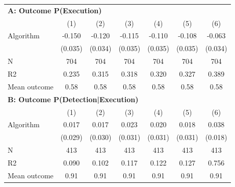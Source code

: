 \begin{tabular}{lcccccc} \toprule
\multicolumn{7}{l}{\textbf{A: Outcome P(Execution)}} \\ \multicolumn{1}{l}{} & (1) & (2) & (3) & (4) & (5) & (6) \\ \midrule
Algorithm   &      -0.150\sym{***}&      -0.120\sym{***}&      -0.115\sym{***}&      -0.110\sym{***}&      -0.108\sym{***}&      -0.063\sym{*}  \\
            &     (0.035)         &     (0.034)         &     (0.035)         &     (0.035)         &     (0.035)         &     (0.034)         \\
\midrule
N           &         704         &         704         &         704         &         704         &         704         &         704         \\
R2          &       0.235         &       0.315         &       0.318         &       0.320         &       0.327         &       0.389         \\
Mean outcome&        0.58         &        0.58         &        0.58         &        0.58         &        0.58         &        0.58         \\

\midrule \multicolumn{7}{l}{\textbf{B: Outcome P(Detection|Execution)}} \\ \multicolumn{1}{l}{} & (1) & (2) & (3) & (4) & (5) & (6) \\ \midrule
Algorithm   &       0.017         &       0.017         &       0.023         &       0.020         &       0.018         &       0.038\sym{**} \\
            &     (0.029)         &     (0.030)         &     (0.031)         &     (0.031)         &     (0.031)         &     (0.018)         \\
\midrule
N           &         413         &         413         &         413         &         413         &         413         &         413         \\
R2          &       0.090         &       0.102         &       0.117         &       0.122         &       0.127         &       0.756         \\
Mean outcome&        0.91         &        0.91         &        0.91         &        0.91         &        0.91         &        0.91         \\


\end{tabular}
